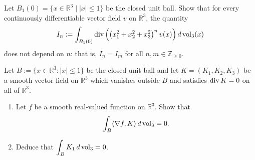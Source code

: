\begin{exercise}
\label{ex:radial_weight_flux_independent}
Let $B_1(0) = \{x \in \mathbb{R}^3 \mid \lvert x\rvert \le 1\}$ be the closed unit ball. Show that
for every continuously differentiable vector field $v$ on $\mathbb{R}^3$, the quantity
\[I_n := \int_{B_1(0)} \operatorname{div}\Big(\big(x_1^2+x_2^2+x_3^2\big)^n\, v(x)\Big) \, d\operatorname{vol}_3(x)\]
does not depend on $n$: that is, $I_n = I_m$ for all $n,m \in \mathbb{Z}_{\ge 0}$.
\end{exercise}

\begin{exercise}
\label{ex:knoerrer_divergence_free_compact_support}
Let $B := \{x \in \mathbb{R}^3 : \lvert x\rvert \le 1\}$ be the closed unit ball and let
$K = (K_1,K_2,K_3)$ be a smooth vector field on $\mathbb{R}^3$ which vanishes outside $B$ and
satisfies $\operatorname{div} K = 0$ on all of $\mathbb{R}^3$.
\begin{enumerate}[label=\textbf{(\alph*)}]
  \item Let $f$ be a smooth real-valued function on $\mathbb{R}^3$. Show that
    \[\int_B \langle \nabla f, K\rangle \, d\operatorname{vol}_3 = 0.\]
  \item Deduce that $\displaystyle\int_B K_1 \, d\operatorname{vol}_3 = 0$.
\end{enumerate}
\end{exercise}

